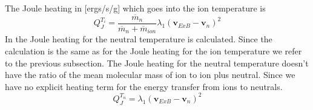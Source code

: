 The Joule heating in [ergs/s/g] which goes into the ion temperature
is
%
\begin{equation}
  Q_J^{T_i}=
  \frac{\overline{m}_n}{\overline{m}_n+\overline{m}_{ion}}
  \lambda_1 (\textbf{v}_{ExB}-\textbf{v}_n)^2
\end{equation}
%
In  the Joule heating for the neutral
temperature is calculated. Since the calculation is the same as for
the Joule heating for the ion temperature we refer to the previous
subsection. The Joule heating for the neutral temperature doesn't
have the ratio of the mean molecular mass of ion to ion plus
neutral. Since we have no explicit heating term for the energy
transfer from ions to neutrals.
%
\begin{equation}
  Q_J^{T_n}=
  \lambda_1 (\textbf{v}_{ExB}-\textbf{v}_n)^2
\end{equation}
%
